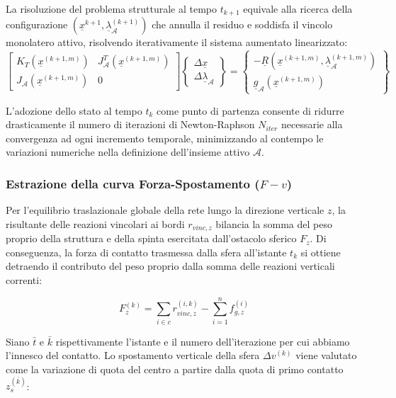 La risoluzione del problema strutturale al tempo $t_{k+1}$ equivale alla ricerca della configurazione $(\underline{x}^{k+1}, \underline{\lambda}_{\mathcal{A}}^{(k+1)})$ che annulla il residuo e soddisfa il vincolo monolatero attivo, risolvendo iterativamente il sistema aumentato linearizzato:
\begin{equation}
\begin{bmatrix} 
K_T\left(\underline{x}^{(k+1, m)}\right) & J_{\mathcal{A}}^T\left(\underline{x}^{(k+1, m)}\right)\\
J_{\mathcal{A}}\left(\underline{x}^{(k+1, m)}\right) & 0 
\end{bmatrix} 
\begin{Bmatrix} 
\Delta \underline{x} \\
\Delta \underline{\lambda}_{\mathcal{A}} 
\end{Bmatrix} = 
\begin{Bmatrix} 
-\underline{R}\left(\underline{x}^{(k+1, m)}, \underline{\lambda}_{\mathcal{A}}^{(k+1, m)}\right)\\
\underline{g}_{\mathcal{A}}\left(\underline{x}^{(k+1, m)}\right) 
\end{Bmatrix}
\label{eq:quasistatic_kkt}
\end{equation}

L'adozione dello stato al tempo $t_k$ come punto di partenza consente di ridurre drasticamente il numero di iterazioni di Newton-Raphson $N_{iter}$ necessarie alla convergenza ad ogni incremento temporale, minimizzando al contempo le variazioni numeriche nella definizione dell'insieme attivo $\mathcal{A}$.

\subsubsection{Estrazione della curva Forza-Spostamento ($F-v$)}
Per l'equilibrio traslazionale globale della rete lungo la direzione verticale $z$, la risultante delle reazioni vincolari ai bordi $r_{vinc,z}$ bilancia la somma del peso proprio della struttura e della spinta esercitata dall'ostacolo sferico $F_z$. Di conseguenza, la forza di contatto trasmessa dalla sfera all'istante $t_k$ si ottiene detraendo il contributo del peso proprio dalla somma delle reazioni verticali correnti:

\begin{equation}
F_z^{(k)} = \sum_{i \in c} r_{vinc, z}^{(i, k)} - \sum_{i=1}^{n} f_{g,z}^{(i)}
\end{equation}

Siano $\bar{t}$ e $\bar{k}$ rispettivamente l'istante e il numero dell'iterazione per cui abbiamo l'innesco del contatto. Lo spostamento verticale della sfera $\Delta v^{(k)}$ viene valutato come la variazione di quota del centro a partire dalla quota di primo contatto $z_s^{(\bar{k})}$:

